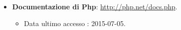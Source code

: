 \begin{itemize}
\begin{itemize}
					\item \textbf{Documentazione di Php}: \url{http://php.net/docs.php}.
					\begin{itemize}
						\item Data ultimo accesso : 2015-07-05.						
					\end{itemize}
					
				\end{itemize}

	\end{itemize}
